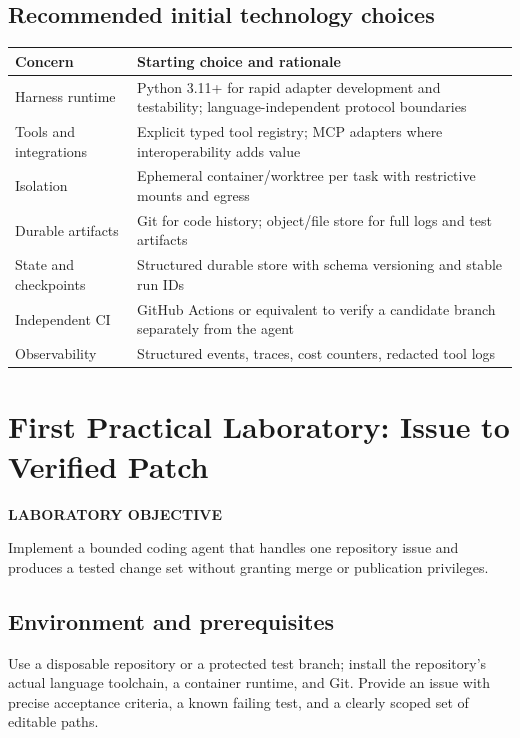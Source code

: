 \documentclass[10pt,letterpaper]{article}
\newcommand{\smallcaplabel}[1]{\textsf{\bfseries\footnotesize\color{Ocean}\MakeUppercase{#1}}}
\begin{document}
\subsection{Recommended initial technology choices}
\begin{tabularx}{\textwidth}{L{3.2cm} Y}
\toprule
\textbf{Concern} & \textbf{Starting choice and rationale} \\
\midrule
Harness runtime & Python 3.11+ for rapid adapter development and testability; language-independent protocol boundaries \\
Tools and integrations & Explicit typed tool registry; MCP adapters where interoperability adds value \\
Isolation & Ephemeral container/worktree per task with restrictive mounts and egress \\
Durable artifacts & Git for code history; object/file store for full logs and test artifacts \\
State and checkpoints & Structured durable store with schema versioning and stable run IDs \\
Independent CI & GitHub Actions or equivalent to verify a candidate branch separately from the agent \\
Observability & Structured events, traces, cost counters, redacted tool logs \\
\bottomrule
\end{tabularx}

\section{First Practical Laboratory: Issue to Verified Patch}\label{sec:lab}
\smallcaplabel{Laboratory objective}\par
Implement a bounded coding agent that handles one repository issue and produces a tested change set without granting merge or publication privileges.

\subsection{Environment and prerequisites}
Use a disposable repository or a protected test branch; install the repository's actual language toolchain, a container runtime, and Git. Provide an issue with precise acceptance criteria, a known failing test, and a clearly scoped set of editable paths.
\end{document}
